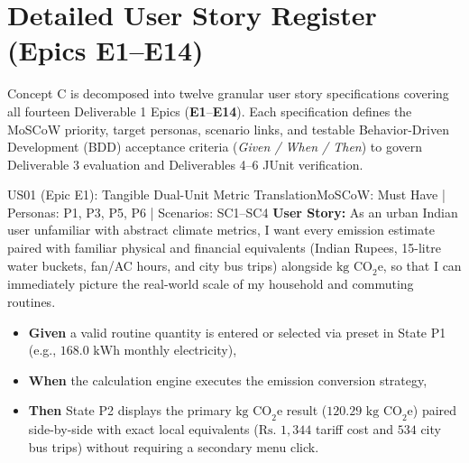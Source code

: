 \documentclass[12pt, a4paper]{article}
\begin{document}
\newpage

\section{Detailed User Story Register (Epics E1--E14)}
Concept C is decomposed into twelve granular user story specifications covering all fourteen Deliverable 1 Epics (\textbf{E1}--\textbf{E14}). Each specification defines the MoSCoW priority, target personas, scenario links, and testable Behavior-Driven Development (BDD) acceptance criteria (\textit{Given / When / Then}) to govern Deliverable 3 evaluation and Deliverables 4--6 JUnit verification.

\begin{storybox}{US01 (Epic E1): Tangible Dual-Unit Metric Translation}{MoSCoW: Must Have | Personas: P1, P3, P5, P6 | Scenarios: SC1--SC4}
\textbf{User Story:} As an urban Indian user unfamiliar with abstract climate metrics, I want every emission estimate paired with familiar physical and financial equivalents (Indian Rupees, 15-litre water buckets, fan/AC hours, and city bus trips) alongside $\text{kg CO}_2\text{e}$, so that I can immediately picture the real-world scale of my household and commuting routines.
\begin{itemize}
    \item \textbf{Given} a valid routine quantity is entered or selected via preset in State P1 (e.g., $168.0\text{ kWh}$ monthly electricity),
    \item \textbf{When} the calculation engine executes the emission conversion strategy,
    \item \textbf{Then} State P2 displays the primary $\text{kg CO}_2\text{e}$ result ($120.29\text{ kg CO}_2\text{e}$) paired side-by-side with exact local equivalents ($\text{Rs. }1,344$ tariff cost and $534$ city bus trips) without requiring a secondary menu click.
\end{itemize}
\end{storybox}
\end{document}
